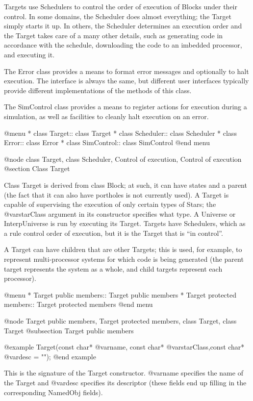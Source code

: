 Targets use Schedulers to control the order of execution of Blocks under
their control.  In some domains, the Scheduler does almost everything;
the Target simply starts it up.  In others, the Scheduler determines
an execution order and the Target takes care of a many other
details, such as generating code in accordance with the schedule,
downloading the code to an imbedded processor, and executing it.

The Error class provides a means to format error messages and optionally
to halt execution.  The interface is always the same, but different
user interfaces typically provide different implementations of the
methods of this class.

The SimControl class provides a means to register actions for execution
during a simulation, as well as facilities to cleanly halt execution
on an error.

@menu
* class Target::                class Target
* class Scheduler::             class Scheduler
* class Error::                 class Error
* class SimControl::            class SimControl
@end menu

@node class Target, class Scheduler, Control of execution, Control of execution
@section Class Target

Class Target is derived from class Block; at such, it can have states
and a parent (the fact that it can also have portholes is not currently
used).  A Target is capable of supervising the execution of only certain
types of Stars; the @var{starClass} argument in its constructor
specifies what type.  A Universe or InterpUniverse is run by executing
its Target.  Targets have Schedulers, which as a rule control order of
execution, but it is the Target that is ``in control''.

A Target can have children that are other Targets; this is used, for
example, to represent multi-processor systems for which code is being
generated (the parent target represents the system as a whole, and
child targets represent each processor).

@menu
* Target public members::       Target public members
* Target protected members::    Target protected members
@end menu

@node Target public members, Target protected members, class Target, class Target
@subsection Target public members

@example
Target(const char* @var{name}, const char* @var{starClass},const char* @var{desc} = "");
@end example

This is the signature of the Target constructor. @var{name} specifies
the name of the Target and @var{desc} specifies its descriptor (these
fields end up filling in the corresponding NamedObj fields).

